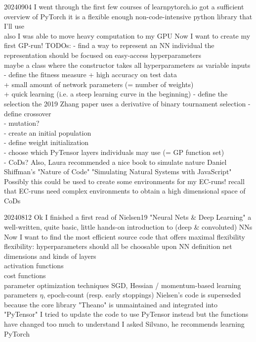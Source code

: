 \documentclass{article}\usepackage[margin=2cm]{geometry}
\begin{document}
\begin{cascade}
    20240904
    \stepin
    I went through the first few courses of learnpytorch.io
    \stepin
    got a sufficient overview of PyTorch 
    \stepin
    it is a flexible enough non-code-intensive python library that I'll use\\
    also I was able to move heavy computation to my GPU
    \stepout
    \stepout
    Now I want to create my first GP-run!
    \stepin
    TODOs:
    \stepin
    - find a way to represent an NN individual
    \stepin
    the representation should be focused on easy-access hyperparameters\\
    maybe a class where the constructor takes all hyperparameters as variable inputs
    \stepout
    - define the fitness measure
    \stepin
    + high accuracy on test data\\
    + small amount of network parameters (= number of weights)\\
    + quick learning (i.e. a steep learning curve in the beginning)
    \stepout
    - define the selection
    \stepin
    the 2019 Zhang paper uses a derivative of binary tournament selection
    \stepout
    - define crossover\\
    - mutation?\\
    - create an initial population \\
    - define weight initialization\\
    - choose which PyTensor layers individuals may use (= GP function set)\\
    - CoDs?
    \stepout
    \stepout
    Also, Laura recommended a nice book to simulate nature
    \stepin
    Daniel Shiffman's "Nature of Code"
    \stepin
    "Simulating Natural Systems with JavaScript"
    \stepout
    Possibly this could be used to create some environments for my EC-runs!
    \stepin
    recall that EC-runs need complex environments to obtain a high dimensional space of CoDs
\end{cascade}
\begin{cascade}
    20240812
    \stepin
    Ok I finished a first read of Nielsen19 "Neural Nets \& Deep Learning"
    \stepin
    a well-written, quite basic, little hands-on introduction to (deep \& convoluted) NNs
    \stepout
    Now I want to find the most efficient source code that offers maximal flexibility
    \stepin
    flexibility: hyperparameters should all be choosable upon NN definition
    \stepin
    net dimensions and kinds of layers\\
    activation functions\\
    cost functions\\
    parameter optimization techniques
    \stepin
    SGD, Hessian / momentum-based
    \stepout
    learning parameters
    \stepin
    $\eta$, epoch-count (resp. early stoppings)
    \stepout
    \stepout
    Nielsen's code is superseded because the core library "Theano" is unmaintained and integrated into "PyTensor"
    \stepin
    I tried to update the code to use PyTensor instead but the functions have changed too much to understand
    \stepout
    I asked Silvano, he recommends learning PyTorch
\end{cascade}
\end{document}
